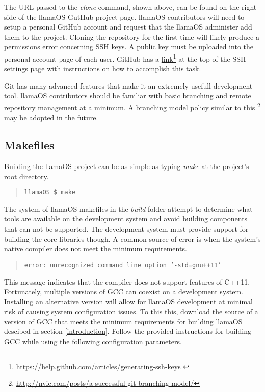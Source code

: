 \documentclass[draft]{article}
\begin{document}
The URL passed to the \emph{clone} command, shown above, can be found on the 
right side of the llamaOS GutHub project page.  llamaOS contributors will need 
to setup a personal GitHub account and request that the llamaOS administer add 
them to the project.  Cloning the repository for the first time will likely 
produce a permissions error concerning SSH keys.  A public key must be uploaded 
into the personal account page of each user.  GitHub has a 
\href{https://help.github.com/articles/generating-ssh-keys}{link}\footnote{\url{
https://help.github.com/articles/generating-ssh-keys }} at the top of the SSH 
settings page with instructions on how to accomplish this task.

Git has many advanced features that make it an extremely usefull development 
tool.  llamaOS contributors should be familiar with basic branching and remote 
repository management at a minimum.  A branching model policy similar to 
\href{http://nvie.com/posts/a-successful-git-branching-model/}{this}
\footnote { \url { http://nvie.com/posts/a-successful-git-branching-model/}} 
may be adopted in the future.

\subsection{Makefiles}

Building the llamaOS project can be as simple as typing \emph{make} at the 
project's root directory.

\begin{quote}
\texttt{llamaOS \$ make}
\end{quote}

The system of llamaOS makefiles in the \emph{build} folder attempt to determine 
what tools are available on the development system and avoid building 
components that can not be supported.  The development system must provide 
support for building the core libraries though.  A common source of error is 
when the system's native compiler does not meet the minimum requirements.

\begin{quote}
\texttt{error: unrecognized command line option '-std=gnu++11'}
\end{quote}

This message indicates that the compiler does not support features of C++11.  
Fortunately, multiple versions of GCC can coexist on a development system.  
Installing an alternative version will allow for llamaOS development at 
minimal risk of causing system configuration issues.  To this this, download 
the source of a version of GCC that meets the minimum requirements for building 
llamaOS descibed in section \ref{introduction}.  Follow the provided 
instructions for building GCC while using the following configuration 
parameters.
\end{document}
